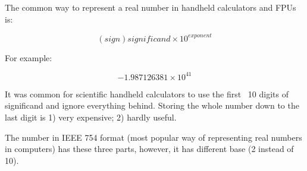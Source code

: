 The common way to represent a real number in handheld calculators and FPUs is:

\begin{equation}
(sign) significand \times 10^{exponent}
\end{equation}

For example:

\begin{equation}
-1.987126381 \times 10^{41}
\end{equation}

It was common for scientific handheld calculators to use the first ~10 digits of significand and ignore everything behind.
Storing the whole number down to the last digit is 1) very expensive; 2) hardly useful.

The number in IEEE 754 format (most popular way of representing real numbers in computers) has these three parts, however, 
it has different base (2 instead of 10).

\levelup{}

